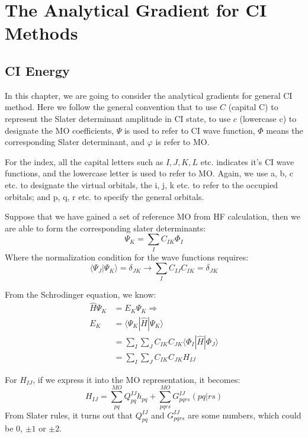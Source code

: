 \chapter{The Analytical Gradient for CI Methods}
%
%
%
%
\section{CI Energy}
%
%
%
%
In this chapter, we are going to consider the analytical gradients for general
CI method. Here we follow the general convention that to use
$C$ (capital C) to represent the Slater determinant amplitude in CI state,
to use $c$ (lowercase c) to designate the MO coefficients, $\Psi$ is used to
refer to CI wave function, $\Phi$ means the corresponding Slater
determinant, and $\varphi$  is refer to MO.

For the index, all the capital letters such as $I,J,K,L$ etc. indicates it's
CI wave functions, and the lowercase letter is used to refer to MO. Again, we
use a, b, c etc. to designate the virtual orbitals, the i, j, k etc. to refer to
the occupied orbitals; and p, q, r etc. to specify the general orbitals.

Suppose that we have gained a set of reference MO from HF calculation, then we
are able to form the corresponding slater determinants:
\begin{equation}
 \label{CI_energy_CI_derivatives:1}
\Psi_{K} = \sum_{I}C_{IK}\Phi_{I}
\end{equation}
Where the normalization condition for the wave functions requires:
\begin{equation}
 \label{CI_energy_CI_derivatives:2}
\langle\Psi_{J}|\Psi_{K}\rangle = \delta_{JK} \rightarrow \sum_{I}C_{IJ}C_{IK} 
= \delta_{JK}
\end{equation}

From the Schrodinger equation, we know:
\begin{align}
 \label{CI_energy_CI_derivatives:3}
\hat{H}\Psi_{K} &= E_{K}\Psi_{K} \Longrightarrow \nonumber \\
E_{K} &= \langle\Psi_{K}|\hat{H}|\Psi_{K}\rangle   \nonumber \\
&=\sum_{I}\sum_{J}C_{IK}C_{JK}\langle\Phi_{I}|\hat{H}|\Phi_{J}\rangle \nonumber
\\
&= \sum_{I}\sum_{J}C_{IK}C_{JK}H_{IJ}
\end{align}

For $H_{IJ}$, if we express it into the MO representation, it becomes:
\begin{equation}
 \label{CI_energy_CI_derivatives:4}
H_{IJ} = \sum_{pq}^{MO}Q_{pq}^{IJ}h_{pq} + \sum_{pqrs}^{MO}G_{pqrs}^{IJ}(pq|rs)
\end{equation}
From Slater rules, it turns out that $Q_{pq}^{IJ}$ and $G_{pqrs}^{IJ}$ are some
numbers, which could be $0$, $\pm 1$ or $\pm 2$. 

